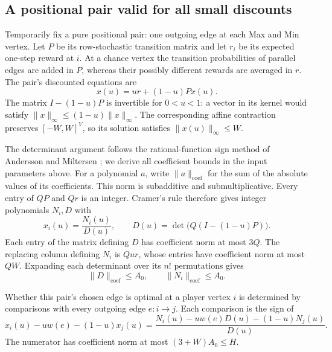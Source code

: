 \subsection{A positional pair valid for all small discounts}

Temporarily fix a pure positional pair: one outgoing edge at each Max
and Min vertex. Let $P$ be its row-stochastic transition matrix and let
$r_i$ be its expected one-step reward at $i$. At a chance vertex the
transition probabilities of parallel edges are added in $P$, whereas
their possibly different rewards are averaged in $r$. The pair's
discounted equations are
\begin{equation}
                       x(u)=u r+(1-u)P x(u).
\label{eq:pair-discount-equations}
\end{equation}
The matrix $I-(1-u)P$ is invertible for $0<u<1$: a vector in its kernel
would satisfy $\|x\|_\infty\le(1-u)\|x\|_\infty$. The corresponding
affine contraction preserves $[-W,W]^V$, so its solution satisfies
$\|x(u)\|_\infty\le W$.

The determinant argument follows the rational-function sign method
of Andersson and Miltersen \cite[Lemma~1]{AnderssonMiltersen2009};
we derive all coefficient bounds in the input parameters above.
For a polynomial $a$, write $\|a\|_{\mathrm{coef}}$ for the sum of
the absolute values of its coefficients. This norm is subadditive and
submultiplicative. Every entry of $QP$ and $Qr$ is an integer. Cramer's
rule therefore gives integer polynomials $N_i,D$ with
\begin{equation}
 x_i(u)=\frac{N_i(u)}{D(u)},
 \qquad D(u)=\det\bigl(Q(I-(1-u)P)\bigr).
\label{eq:discount-cramer}
\end{equation}
Each entry of the matrix defining $D$ has coefficient norm at most $3Q$.
The replacing column defining $N_i$ is $Qu r$, whose entries have
coefficient norm at most $QW$. Expanding each determinant over its $n!$
permutations gives
\begin{equation}
 \|D\|_{\mathrm{coef}}\le A_0,
 \qquad \|N_i\|_{\mathrm{coef}}\le A_0.
\label{eq:discount-polynomial-bound}
\end{equation}

Whether this pair's chosen edge is optimal at a player vertex $i$ is
determined by comparisons with every outgoing edge $e:i\to j$. Each
comparison is the sign of
\begin{equation}
 x_i(u)-u w(e)-(1-u)x_j(u)
   =\frac{N_i(u)-u w(e)D(u)-(1-u)N_j(u)}{D(u)}.
\label{eq:discount-edge-comparison}
\end{equation}
The numerator has coefficient norm at most $(3+W)A_0\le H$.

